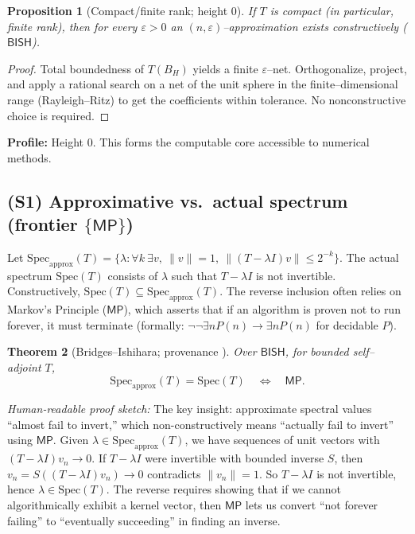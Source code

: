 \documentclass[11pt]{article}
\newcommand{\MP}{\mathsf{MP}}
\theoremstyle{plain}
\newtheorem{theorem}{Theorem}[section]
\newtheorem{proposition}[theorem]{Proposition}
\theoremstyle{definition}
\theoremstyle{remark}
\newenvironment{hrproof}{\noindent\textit{Human-readable proof sketch:} }{}
\newcommand{\BISH}{\mathsf{BISH}}
\begin{document}
\begin{proposition}[Compact/finite rank; height $0$]
If $T$ is compact (in particular, finite rank), then for every $\varepsilon>0$ an $(n,\varepsilon)$--approximation exists constructively ($\BISH$).
\end{proposition}

\begin{proof}
Total boundedness of $T(B_H)$ yields a finite $\varepsilon$--net. Orthogonalize, project, and apply a rational search on a net of the unit sphere in the finite--dimensional range (Rayleigh--Ritz) to get the coefficients within tolerance. No nonconstructive choice is required.
\end{proof}

\noindent\textbf{Profile:} Height 0. This forms the computable core accessible to numerical methods.

\subsection{(S1) Approximative vs.\ actual spectrum (frontier $\{\MP\}$)}
Let $\mathrm{Spec}_{\mathrm{approx}}(T)=\{\lambda:\forall k\ \exists v,\ \|v\|=1,\ \|(T-\lambda I)v\|\le 2^{-k}\}$.
The actual spectrum $\mathrm{Spec}(T)$ consists of $\lambda$ such that $T-\lambda I$ is not invertible.
Constructively, $\mathrm{Spec}(T) \subseteq \mathrm{Spec}_{\mathrm{approx}}(T)$. The reverse inclusion often relies on Markov's Principle ($\MP$), which asserts that if an algorithm is proven not to run forever, it must terminate (formally: $\neg\neg\exists n P(n) \to \exists n P(n)$ for decidable $P$).

\begin{theorem}[Bridges--Ishihara; provenance \cite{BridgesRichman}]
Over $\BISH$, for bounded self--adjoint $T$,
\[
\mathrm{Spec}_{\mathrm{approx}}(T)=\mathrm{Spec}(T)\quad \Longleftrightarrow\quad \MP.
\]
\end{theorem}

\begin{hrproof}
The key insight: approximate spectral values ``almost fail to invert,'' which non-constructively means ``actually fail to invert'' using $\MP$. Given $\lambda\in\mathrm{Spec}_{\mathrm{approx}}(T)$, we have sequences of unit vectors with $(T-\lambda I)v_n\to 0$. If $T-\lambda I$ were invertible with bounded inverse $S$, then $v_n = S((T-\lambda I)v_n)\to 0$ contradicts $\|v_n\|=1$. So $T-\lambda I$ is not invertible, hence $\lambda\in\mathrm{Spec}(T)$. The reverse requires showing that if we cannot algorithmically exhibit a kernel vector, then $\MP$ lets us convert ``not forever failing'' to ``eventually succeeding'' in finding an inverse.
\end{hrproof}
\end{document}
